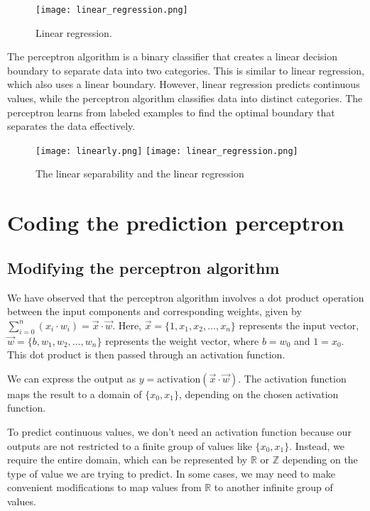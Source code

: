 \begin{figure}[H]
  \centering
  \texttt{[image: linear\_regression.png]}
  \caption{Linear regression.}
\end{figure}

The perceptron algorithm is a binary classifier that creates a linear decision boundary to separate data into two
categories. This is similar to linear regression, which also uses a linear boundary. However, linear regression
predicts continuous values, while the perceptron algorithm classifies data into distinct categories.
The perceptron learns from labeled examples to find the optimal boundary that separates the data effectively.

\begin{figure}[H]
  \centering
  \texttt{[image: linearly.png]}
  \texttt{[image: linear\_regression.png]}
  \caption{The linear separability and the linear regression}
\end{figure}

\section{Coding the prediction perceptron}
\subsection{Modifying the perceptron algorithm}
We have observed that the perceptron algorithm involves a dot product operation between the input components and
corresponding weights, given by $\sum_{i = 0}^n(x_i \cdot w_i) = \vec{x} \cdot \vec{w}$. Here,
$\vec{x} = \{1, x_1, x_2, \ldots, x_n\}$ represents the input vector, $\vec{w} = \{b, w_1, w_2, \ldots, w_n\}$
represents the weight vector, where $b = w_0$ and $1 = x_0$. This dot product is then passed through an
activation function.

We can express the output as $y = \text{activation}(\vec{x} \cdot \vec{w})$. The activation function maps the
result to a domain of $\{x_0, x_1\}$, depending on the chosen activation function.

To predict continuous values, we don't need an activation function because our outputs are not restricted to a
finite group of values like $\{x_0, x_1\}$. Instead, we require the entire domain, which can be represented
by $\mathbb{R}$ or $\mathbb{Z}$ depending on the type of value we are trying to predict. In some cases, we may
need to make convenient modifications to map values from $\mathbb{R}$ to another infinite group of values.

